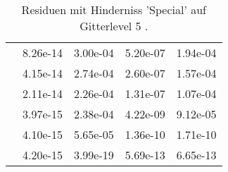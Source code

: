 \begin{table}
\begin{tabular}{c|cc|cc|}
\multicolumn{1}{|c|}{} & \multicolumn{1}{|c|}{  8.26e-14} & \multicolumn{1}{|c|}{  3.00e-04} & \multicolumn{1}{|c|}{  5.20e-07} & \multicolumn{1}{|c|}{  1.94e-04} \\ 
\multicolumn{1}{|c|}{} & \multicolumn{1}{|c|}{  4.15e-14} & \multicolumn{1}{|c|}{  2.74e-04} & \multicolumn{1}{|c|}{  2.60e-07} & \multicolumn{1}{|c|}{  1.57e-04} \\ 
\multicolumn{1}{|c|}{} & \multicolumn{1}{|c|}{  2.11e-14} & \multicolumn{1}{|c|}{  2.26e-04} & \multicolumn{1}{|c|}{  1.31e-07} & \multicolumn{1}{|c|}{  1.07e-04} \\ 
\multicolumn{1}{|c|}{} & \multicolumn{1}{|c|}{  3.97e-15} & \multicolumn{1}{|c|}{  2.38e-04} & \multicolumn{1}{|c|}{  4.22e-09} & \multicolumn{1}{|c|}{  9.12e-05} \\ 
\multicolumn{1}{|c|}{} & \multicolumn{1}{|c|}{  4.10e-15} & \multicolumn{1}{|c|}{  5.65e-05} & \multicolumn{1}{|c|}{  1.36e-10} & \multicolumn{1}{|c|}{  1.71e-10} \\ 
\multicolumn{1}{|c|}{} & \multicolumn{1}{|c|}{  4.20e-15} & \multicolumn{1}{|c|}{  3.99e-19} & \multicolumn{1}{|c|}{  5.69e-13} & \multicolumn{1}{|c|}{  6.65e-13} \\ 
\hline 
\end{tabular}\caption{Residuen mit Hinderniss 'Special' auf Gitterlevel 5 .}\label{tab:Residuum_Special_level5}
\end{table} 
